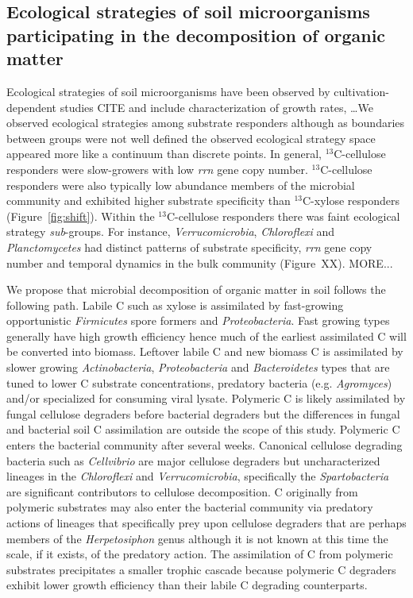 \subsection{Ecological strategies of soil microorganisms participating in the
    decomposition of organic matter}
\label{sub:ecological_strategies}
Ecological strategies of soil microorganisms have been observed by
cultivation-dependent studies CITE and include characterization of growth
rates, \ldots  We observed ecological strategies among substrate
responders although as boundaries between groups were not well defined the
observed ecological strategy space appeared more like a continuum than discrete
points. In general, $^{13}$C-cellulose responders were slow-growers with low
\textit{rrn} gene copy number. $^{13}$C-cellulose responders were also
typically low abundance members of the microbial community and exhibited higher
substrate specificity than $^{13}$C-xylose responders (Figure~\ref{fig:shift}).
Within the $^{13}$C-cellulose responders there was faint 
ecological strategy \textit{sub}-groups. For instance,
\textit{Verrucomicrobia}, \textit{Chloroflexi} and \textit{Planctomycetes} had
distinct patterns of substrate specificity, \textit{rrn} gene copy number and
temporal dynamics in the bulk community (Figure~XX). MORE...

We propose that microbial decomposition of organic matter in soil follows the
following path. Labile C such as xylose is assimilated by fast-growing
opportunistic \textit{Firmicutes} spore formers and \textit{Proteobacteria}.
Fast growing types generally have high growth efficiency hence much of the
earliest assimilated C will be converted into biomass. Leftover labile C and
new biomass C is assimilated by slower growing \textit{Actinobacteria},
\textit{Proteobacteria} and \textit{Bacteroidetes} types that are tuned to
lower C substrate concentrations, predatory bacteria (e.g. \textit{Agromyces})
and/or specialized for consuming viral lysate. Polymeric C is likely
assimilated by fungal cellulose degraders before bacterial degraders but the
differences in fungal and bacterial soil C assimilation are outside the scope
of this study. Polymeric C enters the bacterial community after several weeks.
Canonical cellulose degrading bacteria such as \textit{Cellvibrio} are major
cellulose degraders but uncharacterized lineages in the \textit{Chloroflexi}
and \textit{Verrucomicrobia}, specifically the \textit{Spartobacteria} are
significant contributors to cellulose decomposition.  C originally from
polymeric substrates may also enter the bacterial community via predatory
actions of lineages that specifically prey upon cellulose degraders that are
perhaps members of the \textit{Herpetosiphon} genus although it is not known at
this time the scale, if it exists, of the predatory action. The assimilation of
C from polymeric substrates precipitates a smaller trophic cascade because
polymeric C degraders exhibit lower growth efficiency than their labile C
degrading counterparts.
